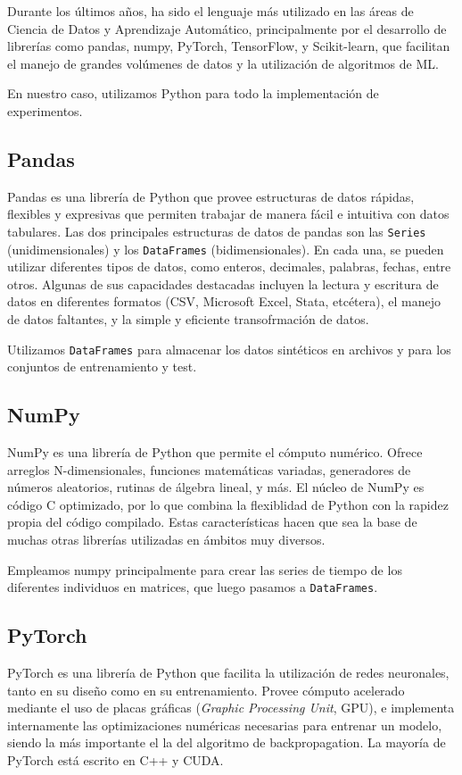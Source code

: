 \documentclass[../../main.tex]{subfiles}
\begin{document}
Durante los últimos años, ha sido el lenguaje más utilizado en las áreas de Ciencia
de Datos y Aprendizaje Automático, principalmente por el desarrollo de librerías
como pandas, numpy, PyTorch, TensorFlow, y Scikit-learn, que facilitan el manejo
de grandes volúmenes de datos y la utilización de algoritmos de ML.

En nuestro caso, utilizamos Python para todo la implementación de experimentos.

\subsection{Pandas}
Pandas es una librería de Python que provee estructuras de datos rápidas, flexibles y
expresivas que permiten trabajar de manera fácil e intuitiva con datos tabulares. Las dos
principales estructuras de datos de pandas son las \texttt{Series} (unidimensionales) y
los \texttt{DataFrames} (bidimensionales). En cada una, se pueden utilizar diferentes
tipos de datos, como enteros, decimales, palabras, fechas, entre otros. Algunas de sus
capacidades destacadas incluyen la lectura y escritura de datos en diferentes formatos
(CSV, Microsoft Excel, Stata, etcétera), el manejo de datos faltantes, y la simple y
eficiente transofrmación de datos.

Utilizamos \texttt{DataFrames} para almacenar los datos sintéticos en archivos
y para los conjuntos de entrenamiento y test.

\subsection{NumPy}
NumPy es una librería de Python que permite el cómputo numérico. Ofrece arreglos
N-dimensionales, funciones matemáticas variadas, generadores de números aleatorios,
rutinas de álgebra lineal, y más. El núcleo de NumPy es código C optimizado, por
lo que combina la flexiblidad de Python con la rapidez propia del código compilado.
Estas características hacen que sea la base de muchas otras librerías utilizadas
en ámbitos muy diversos.

Empleamos numpy principalmente para crear las series de tiempo de los diferentes
individuos en matrices, que luego pasamos a \texttt{DataFrames}.

\subsection{PyTorch}
PyTorch es una librería de Python que facilita la utilización de redes neuronales, tanto
en su diseño como en su entrenamiento. Provee cómputo acelerado mediante el uso de placas
gráficas (\textit{Graphic Processing Unit}, GPU), e implementa internamente las
optimizaciones numéricas necesarias para entrenar un modelo, siendo la más importante el
la del algoritmo de backpropagation. La mayoría de PyTorch está escrito en C++ y CUDA.
\end{document}
